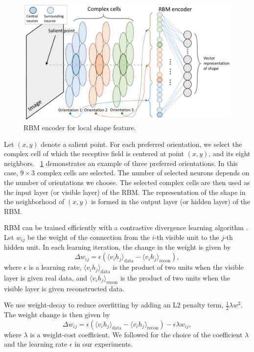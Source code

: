 \documentclass[conference]{IEEEtran}
\begin{document}
\begin{figure}[htp]
\centerline{\includegraphics[width=0.99\linewidth]{images/fig5.pdf}} 
\caption{RBM encoder for local shape feature.}
\label{fig:5}
\end{figure}

Let $(x,y)$ denote a salient point.
For each preferred orientation, 
we select the complex cell of which the receptive field is centered at point $(x,y)$,
and its eight neighbors.
\figurename~\ref{fig:5} demonstrates an example of three preferred orientations.
In this case, $9\times3$ complex cells are selected.
The number of selected neurons depends on the number of orientations we choose.
The selected complex cells are then used as the input layer (or visible layer) of the RBM.
The representation of the shape in the neighborhood of $(x,y)$
is formed in the output layer (or hidden layer) of the RBM.

RBM can be trained efficiently with a contrastive divergence learning algorithm \cite{hinton2002}.
Let $w_{ij}$ be the weight of the connection from the $i$-th visible unit to the $j$-th hidden unit.
In each learning iteration, the change in the weight is given by
\begin{equation}
\Delta w_{ij}=\epsilon\left(\langle v_i h_j\rangle_\text{data}-\langle v_i h_j\rangle_\text{recon}\right),
\end{equation}
where $\epsilon$ is a learning rate, 
$\langle v_i h_j\rangle_\text{data}$ is the product of two units when the visible layer is given real data,
and $\langle v_i h_j\rangle_\text{recon}$ is the product of two units 
when the visible layer is given reconstructed data.

We use weight-decay \cite{hinton2010}
to reduce overfitting by adding an L2 penalty term, $\frac{1}{2}\lambda w^2$.
The weight change is then given by
\begin{equation}
\Delta w_{ij}=\epsilon\left(\langle v_i h_j\rangle_\text{data}-\langle v_i h_j\rangle_\text{recon}\right)
-\epsilon\lambda w_{ij},
\end{equation}
where $\lambda$ is a weight-cost coefficient.
We followed \cite{hinton2010} for the choice of the coefficient $\lambda$ and the learning rate $\epsilon$
in our experiments.
\end{document}
